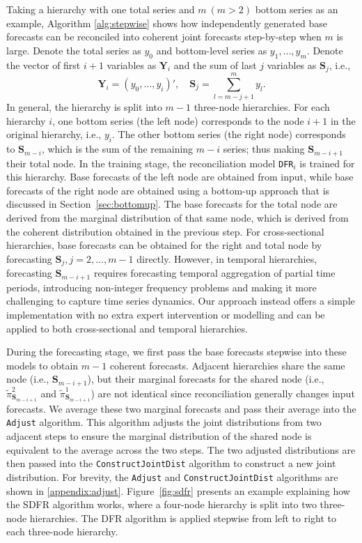 \documentclass[a4paper,review,12pt,authoryear]{elsarticle}
\let\code=\texttt
\newcommand{\bY}{\mathbf{Y}}
\theoremstyle{definition}
\begin{document}
  Taking a hierarchy with one total series and $m~(m>2)$ bottom series as an example, Algorithm \ref{alg:stepwise} shows how independently generated base forecasts can be reconciled into coherent joint forecasts step-by-step when $m$ is large.
  Denote the total series as $y_0$ and bottom-level series as $y_1, \dots, y_m$.
  Denote the vector of first $i+1$ variables as $\mathbf{Y}_i$ and the sum of last $j$ variables as $\mathbf{S}_j$, i.e.,
  \[
    \bY_i = (y_0, \dots, y_i)', \quad \mathbf{S}_j = \sum_{l=m-j+1}^{m} y_l.
  \]
  In general, the hierarchy is split into $m-1$ three-node hierarchies.
  For each hierarchy $i$, one bottom series (the left node) corresponds to the node $i+1$ in the original hierarchy, i.e., $y_{i}$. The other bottom series (the right node) corresponds to $\mathbf{S}_{m-i}$, which is the sum of the remaining $m-i$ series; thus making $\mathbf{S}_{m-i+1}$ their total node.
  In the training stage, the reconciliation model \code{DFR}$_i$ is trained for this hierarchy.
  Base forecasts of the left node are obtained from input, while base forecasts of the right node are obtained using a bottom-up approach that is discussed in Section~\ref{sec:bottomup}.
  The base forecasts for the total node are derived from the marginal distribution of that same node, which is derived from the coherent distribution obtained in the previous step.
  For cross-sectional hierarchies, base forecasts can be obtained for the right and total node by forecasting $\mathbf{S}_{j}, j=2,\dots,m-1$ directly.
  However, in temporal hierarchies, forecasting $\mathbf{S}_{m-i+1}$ requires forecasting temporal aggregation of partial time periods, introducing non-integer frequency problems and making it more challenging to capture time series dynamics.
  Our approach instead offers a simple implementation with no extra expert intervention or modelling and can be applied to both cross-sectional and temporal hierarchies.

  During the forecasting stage, we first pass the base forecasts stepwise into these models to obtain $m-1$ coherent forecasts.
  Adjacent hierarchies share the same node (i.e., $\mathbf{S}_{m-i+1}$), but their marginal forecasts for the shared node (i.e., $\tilde\pi^{2}_{\mathbf{S}_{m-i+1}}$ and $\tilde\pi^{1}_{\mathbf{S}_{m-i+1}}$) are not identical since reconciliation generally changes input forecasts.
  We average these two marginal forecasts and pass their average into the \code{Adjust} algorithm. This algorithm adjusts the joint distributions from two adjacent steps to ensure the marginal distribution of the shared node is equivalent to the average across the two steps.
  The two adjusted distributions are then passed into the \code{ConstructJointDist} algorithm to construct a new joint distribution.
  For brevity, the \code{Adjust} and \code{ConstructJointDist} algorithms are shown in \ref{appendix:adjust}.
  Figure~\ref{fig:sdfr} presents an example explaining how the SDFR algorithm works, where a four-node hierarchy is split into two three-node hierarchies. The DFR algorithm is applied stepwise from left to right to each three-node hierarchy.
\end{document}
